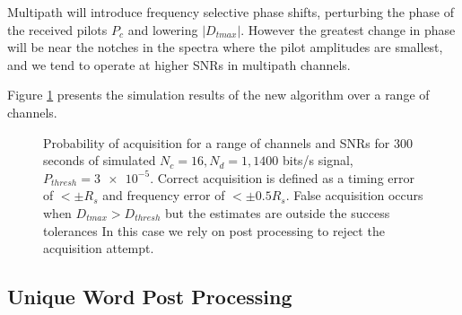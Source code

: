 \documentclass{article}
\begin{document}
Multipath will introduce frequency selective phase shifts, perturbing the phase of the received pilots $P_c$ and lowering $|D_{tmax}|$.  However the greatest change in phase will be near the notches in the spectra where the pilot amplitudes are smallest, and we tend to operate at higher SNRs in multipath channels.

Figure \ref{fig:acq_curves} presents the simulation results of the new algorithm over a range of channels.

\begin{figure}[H]
\caption{Probability of acquisition for a range of channels and SNRs for 300 seconds of simulated $N_c=16, N_d=1, 1400$ bits/s signal, $P_{thresh}=\num{3e-5}$. Correct acquisition is defined as a timing error of $< \pm R_s$ and frequency error of $< \pm 0.5R_s$.  False acquisition occurs when $D_{tmax} > D_{thresh}$ but the estimates are outside the success tolerances  In this case we rely on post processing to reject the acquisition attempt.}
\label{fig:acq_curves}
\begin{center}

\end{center}
\end{figure}

\subsection{Unique Word Post Processing}
\label{sec:uw}
\end{document}
